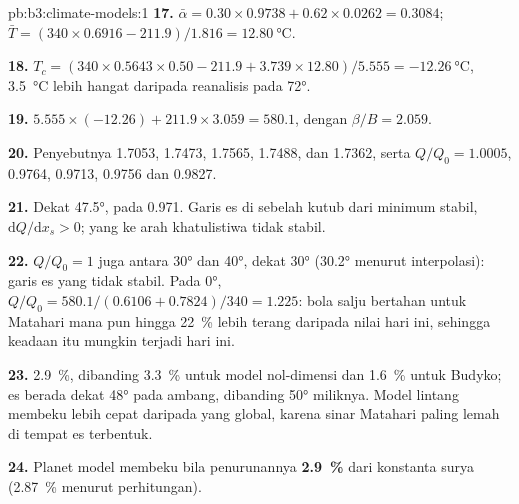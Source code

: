 \begin{solution}{pb:b3:climate-models:1}
\textbf{17.} $\bar\alpha = 0.30\times0.9738 + 0.62\times0.0262 =
\num{0.3084}$; $\bar T = (340\times0.6916 - 211.9)/1.816 =
\qty{12.80}{\celsius}$.

\textbf{18.} $T_c = (340\times0.5643\times0.50 - 211.9 + 3.739\times12.80)/
5.555 = \qty{-12.26}{\celsius}$, \qty{3.5}{\celsius} lebih hangat daripada
reanalisis pada \ang{72}.

\textbf{19.} $5.555\times(-12.26) + 211.9\times3.059 = \num{580.1}$, dengan
$\beta/B = \num{2.059}$.

\textbf{20.} Penyebutnya 1.7053, 1.7473, 1.7565, 1.7488, dan
1.7362, serta $Q/Q_0 = \num{1.0005}$, \num{0.9764}, \num{0.9713},
\num{0.9756} dan \num{0.9827}.

\textbf{21.} Dekat \ang{47.5}, pada \num{0.971}. Garis es di sebelah kutub
dari minimum stabil, $\mathrm dQ/\mathrm dx_s > 0$; yang ke arah khatulistiwa
tidak stabil.

\textbf{22.} $Q/Q_0 = 1$ juga antara \ang{30} dan \ang{40}, dekat
\ang{30} (\ang{30.2} menurut interpolasi): garis es yang tidak stabil. Pada \ang{0},
$Q/Q_0 = 580.1/(0.6106 + 0.7824)/340 = \num{1.225}$: bola salju bertahan
untuk Matahari mana pun hingga \qty{22}{\percent} lebih terang daripada nilai hari ini, sehingga
keadaan itu mungkin terjadi hari ini.

\textbf{23.} \qty{2.9}{\percent}, dibanding \qty{3.3}{\percent} untuk
model nol-dimensi dan \qty{1.6}{\percent} untuk Budyko; es berada
dekat \ang{48} pada ambang, dibanding \ang{50} miliknya. Model lintang
membeku lebih cepat daripada yang global, karena sinar Matahari paling lemah di
tempat es terbentuk.

\textbf{24.} Planet model membeku bila penurunannya
\textbf{\qty[text-series-to-math=true]{2.9}{\percent}} dari konstanta surya
(\qty{2.87}{\percent} menurut perhitungan).
\end{solution}
